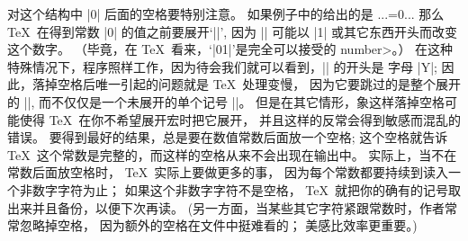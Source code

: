 {{{{{{{{%
\ddanger 对这个结构中 |0| 后面的空格要特别注意。%
如果例子中的给出的是
\begintt
...=0\fullypaid...
\endtt
那么 \TeX\ 在得到常数 |0| 的值之前要展开`|\fullypaid|',
因为 |\fullypaid| 可能以 |1| 或其它东西开头而改变这个数字。%
（毕竟，在 \TeX\ 看来，`|01|'是完全可以接受的 \<number>。）
在这种特殊情况下，程序照样工作，因为待会我们就可以看到，|\fullypaid| 的开头是%
字母 |Y|; 因此，落掉空格后唯一引起的问题就是 \TeX\ 处理变慢，
因为它要跳过的是整个展开的 |\fullypaid|, 而不仅仅是一个未展开的单个记号 |\fullypaid|。%
但是在其它情形，象这样落掉空格可能使得 \TeX\ 在你不希望展开宏时把它展开，
并且这样的反常会得到敏感而混乱的错误。%
要得到最好的结果，{总是要在数值常数后面放一个空格};
这个空格就告诉 \TeX\ 这个常数是完整的，而这样的空格从来不会出现在输出中。%
实际上，当不在常数后面放空格时， \TeX\ 实际上要做更多的事，
因为每个常数都要持续到读入一个非数字字符为止；
如果这个非数字字符不是空格， \TeX\ 就把你的确有的记号取出来并且备份，以便下次再读。%
(另一方面，当某些其它字符紧跟常数时，作者常常忽略掉空格，
因为额外的空格在文件中挺难看的；
美感比效率更重要。)

}}}}}}}}
